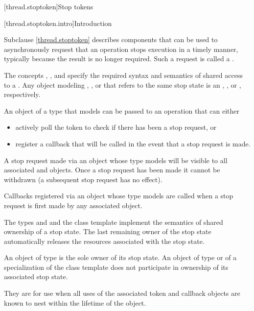 [thread.stoptoken]{Stop tokens}

[thread.stoptoken.intro]{Introduction}

\pnum
Subclause \ref{thread.stoptoken} describes components that can be used
to asynchronously request that an operation stops execution in a timely manner,
typically because the result is no longer required.
Such a request is called a .

\pnum
The concepts
,
, and
specify the required syntax and semantics of
shared access to a .
Any object modeling ,
, or
that refers to the same stop state is
an 
,
, or
,
respectively.

\pnum
An object of a type that models 
can be passed to an operation that can either
\begin{itemize}
 \item actively poll the token to check if there has been a stop request, or
 \item register a callback that
        will be called in the event that a stop request is made.
\end{itemize}
A stop request made via an object
whose type models 
will be visible to
all associated  and
 objects.
Once a stop request has been made it cannot be withdrawn
(a subsequent stop request has no effect).

\pnum
Callbacks registered via an object
whose type models 
are called when a stop request is first made
by any associated  object.

\pnum
The types  and  and
the class template  implement
the semantics of shared ownership of a stop state.
The last remaining owner of the stop state automatically releases
the resources associated with the stop state.

\pnum
An object of type 
is the sole owner of its stop state.
An object of type  or
of a specialization of the class template 
does not participate in ownership of its associated stop state.
\begin{note}
They are for use when all uses of the associated token and callback objects
are known to nest within the lifetime of the  object.
\end{note}

